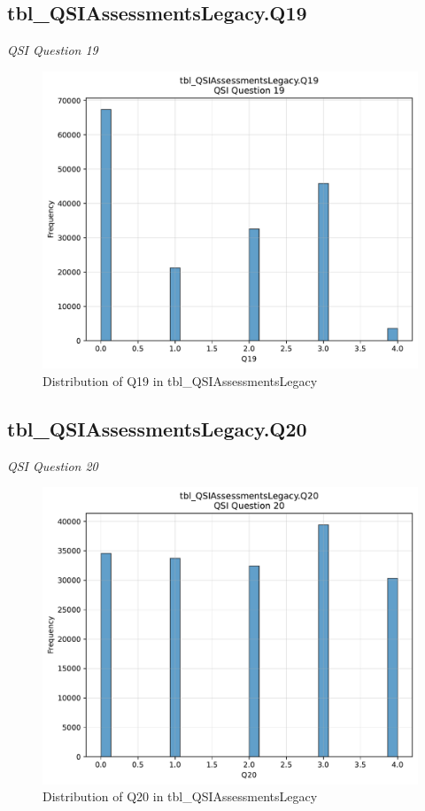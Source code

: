 \subsection{tbl\_QSIAssessmentsLegacy.Q19}
\textit{QSI Question 19}

\begin{figure}[htbp]
\centering
\includegraphics[width=\textwidth]{figures/dbo_tbl_QSIAssessmentsLegacy_Q19.pdf}
\caption{Distribution of Q19 in tbl\_QSIAssessmentsLegacy}
\end{figure}\newpage

\subsection{tbl\_QSIAssessmentsLegacy.Q20}
\textit{QSI Question 20}

\begin{figure}[htbp]
\centering
\includegraphics[width=\textwidth]{figures/dbo_tbl_QSIAssessmentsLegacy_Q20.pdf}
\caption{Distribution of Q20 in tbl\_QSIAssessmentsLegacy}
\end{figure}\newpage

